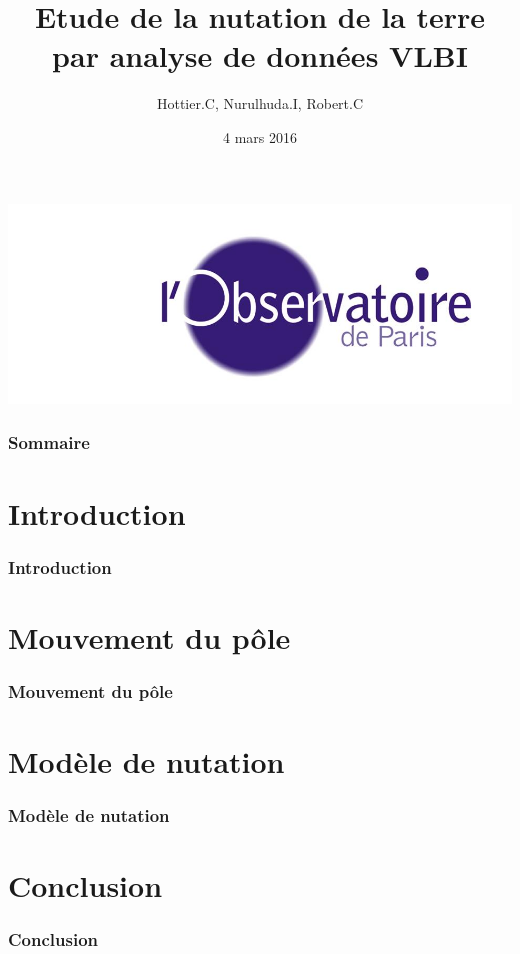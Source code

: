 \documentclass[french]{beamer}
\title[Soutenance MT3]{Etude de la nutation de la terre par analyse de données VLBI}
\author{
Hottier.C, Nurulhuda.I, Robert.C}
\date{4 mars 2016}
\newcommand{\frtt}[1]{\frametitle{#1}}
\begin{document}
\begin{frame}
\maketitle
	\begin{center}
	\includegraphics[height=0.20\textheight]{siteon0.jpg}
	\end{center}
\end{frame}

\begin{frame}
  \frametitle{Sommaire}
  \tableofcontents
\end{frame}

\section{Introduction}

\begin{frame}
  \frtt{Introduction}
\end{frame}


\section{Mouvement du pôle}

\begin{frame}
  \frtt{Mouvement du pôle}
\end{frame}


\section{Modèle de nutation}

\begin{frame}
  \frtt{Modèle de nutation}
\end{frame}


\section{Conclusion}

\begin{frame}
  \frtt{Conclusion}
\end{frame}
\end{document}
